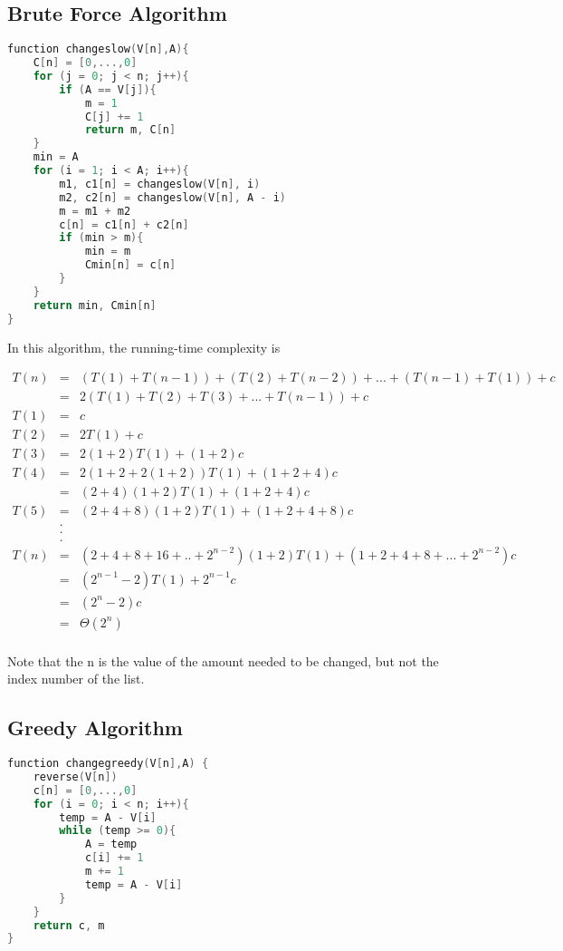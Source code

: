 \documentclass[11pt]{scrreprt}
\begin{document}
\subsection {Brute Force Algorithm}

\begin{lstlisting}[language=c]
function changeslow(V[n],A){
	C[n] = [0,...,0]
	for (j = 0; j < n; j++){
		if (A == V[j]){
			m = 1
			C[j] += 1
			return m, C[n]
	}
	min = A
	for (i = 1; i < A; i++){
		m1, c1[n] = changeslow(V[n], i)
		m2, c2[n] = changeslow(V[n], A - i)
		m = m1 + m2
		c[n] = c1[n] + c2[n]
		if (min > m){
			min = m
			Cmin[n] = c[n]
		}
	}
	return min, Cmin[n]
}
\end{lstlisting}


In this algorithm, the running-time complexity is

\begin{eqnarray*}
T(n) 	& = & (T(1)+ T(n-1)) + (T(2) + T(n-2)) + ... + (T(n-1) + T(1)) + c\\
		& = & 2(T(1) + T(2) + T(3) + ... + T(n-1)) + c\\
T(1)	& = & c\\
T(2) 	& = & 2T(1) + c\\
T(3) 	& = & 2(1+2)T(1) + (1+2)c\\
T(4) 	& = & 2(1+2+2(1+2))T(1) + (1+2+4)c\\
	 	& = & (2+4)(1+2)T(1) + (1+2+4)c\\
T(5) 	& = & (2+4+8)(1+2)T(1) + (1+2+4+8)c\\
		& . & \\
		& . & \\
		& . & \\
T(n) 	& = & (2+4+8+16+..+2^{n-2})(1+2)T(1) + (1+2+4+8+...+2^{n-2})c\\
		& = & (2^{n-1}-2)T(1) + 2^{n-1}c\\
		& = & (2^n-2)c\\
		& = & \Theta(2^n)\\
\end{eqnarray*}

Note that the n is the value of the amount needed to be changed, but not the index number of the list.

\subsection{Greedy Algorithm}

\begin{lstlisting}[language=c]
function changegreedy(V[n],A) {
	reverse(V[n])
	c[n] = [0,...,0]
	for (i = 0; i < n; i++){
		temp = A - V[i]
		while (temp >= 0){
		    A = temp
		    c[i] += 1
		    m += 1
		    temp = A - V[i]
		}
	}
	return c, m
}
\end{lstlisting}
\end{document}
